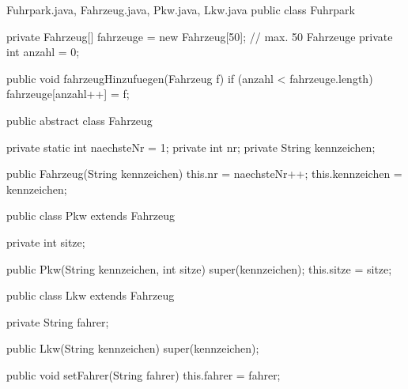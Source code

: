 \begin{center}
\end{center}
\begin{javacode}[breakable]{Fuhrpark.java, Fahrzeug.java, Pkw.java, Lkw.java}
public class Fuhrpark {
	private Fahrzeug[] fahrzeuge = new Fahrzeug[50];    // max. 50 Fahrzeuge
	private int anzahl = 0;

	public void fahrzeugHinzufuegen(Fahrzeug f) {
		if (anzahl < fahrzeuge.length) {
			fahrzeuge[anzahl++] = f;
		}
	}
}

public abstract class Fahrzeug {
	private static int naechsteNr = 1;
	private int nr;
	private String kennzeichen;

	public Fahrzeug(String kennzeichen) {
		this.nr = naechsteNr++;
		this.kennzeichen = kennzeichen;
	}
}

public class Pkw extends Fahrzeug {
	private int sitze;

	public Pkw(String kennzeichen, int sitze) {
		super(kennzeichen);
		this.sitze = sitze;
	}
}

public class Lkw extends Fahrzeug {
	private String fahrer;

	public Lkw(String kennzeichen) {
		super(kennzeichen);
	}

	public void setFahrer(String fahrer) {
		this.fahrer = fahrer;
	}
}
\end{javacode}

